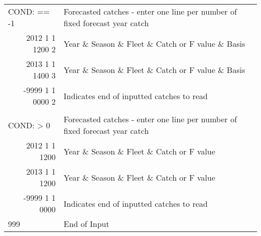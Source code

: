 \begin{landscape}
{\begin{longtable}{p{3.2cm} p{7cm} p{10.8cm}}
  \hline
  \multicolumn{1}{l}{COND: == -1 }& \multicolumn{2}{l}{Forecasted catches - enter one line per number of fixed forecast year catch} \Tstrut\\
  \multicolumn{1}{r}{2012 1 1 1200 2}  & \multicolumn{2}{l}{Year \& Season \& Fleet \& Catch or F value \& Basis}  \\
  \multicolumn{1}{r}{2013 1 1 1400 3}  & \multicolumn{2}{l}{Year \& Season \& Fleet \& Catch or F value \& Basis}  \\
  \multicolumn{1}{r}{-9999 1 1 0000 2}  & \multicolumn{2}{l}{Indicates end of inputted catches to read}  \Bstrut\\
  \\
  \multicolumn{1}{l}{COND: > 0 }& \multicolumn{2}{l}{Forecasted catches - enter one line per number of fixed forecast year catch }\Tstrut\\
  \multicolumn{1}{r}{2012  1 1 1200}  & \multicolumn{2}{l}{Year \& Season \& Fleet \& Catch or F value}  \\
  \multicolumn{1}{r}{2013  1 1 1200}  & \multicolumn{2}{l}{Year \& Season \& Fleet \& Catch or F value}  \\
  \multicolumn{1}{r}{-9999 1 1 0000}  & \multicolumn{2}{l}{Indicates end of inputted catches to read}  \Bstrut\\
  
  \hline
  999 & End of Input & \Bstrut\\

  \end{longtable}}  
\end{landscape}

\hypertarget{Benchmark}{}
